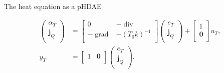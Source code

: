 \documentclass[aspectratio=169]{ISAE-Beamer}
\DeclareMathOperator*{\grad}{grad}
\renewcommand{\div}{\operatorname{div}}
\begin{document}
\begin{frame}{The heat equation as a pHDAE}
\begin{overlayarea}{\textwidth}{\textheight}
{\begin{equation*}
\begin{aligned}
\begin{pmatrix}
\alpha_T \\
\bm{j}_Q \\
\end{pmatrix} &= 
\begin{bmatrix}
0 & -\div \\
-\grad & -(T_0 k)^{-1} \\
\end{bmatrix}
\begin{pmatrix}
e_T \\
\bm{j}_Q \\
\end{pmatrix} + 
\begin{bmatrix}
1 \\
\bm{0} \\
\end{bmatrix} u_T, \\
y_T &= \begin{bmatrix}
1 & \bm{0} \\
\end{bmatrix} \begin{pmatrix}
e_T \\
\bm{j}_Q \\
\end{pmatrix}.
\end{aligned}
\end{equation*}
}
\end{overlayarea}

\end{frame}
\end{document}
